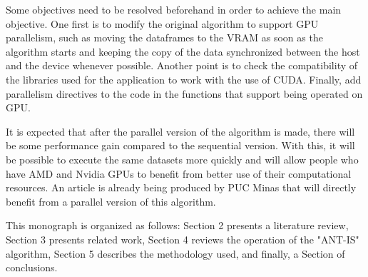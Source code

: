 Some objectives need to be resolved beforehand in order to achieve the main objective. One first is to modify the original algorithm to support GPU parallelism, such as moving the dataframes to the VRAM as soon as the algorithm starts and keeping the copy of the data synchronized between the host and the device whenever possible. Another point is to check the compatibility of the libraries used for the application to work with the use of CUDA. Finally, add parallelism directives to the code in the functions that support being operated on GPU.

It is expected that after the parallel version of the algorithm is made, there will be some performance gain compared to the sequential version. With this, it will be possible to execute the same datasets more quickly and will allow people who have AMD and Nvidia GPUs to benefit from better use of their computational resources. An article is already being produced by PUC Minas that will directly benefit from a parallel version of this algorithm.

This monograph is organized as follows: Section 2 presents a literature review, Section 3 presents related work, Section 4 reviews the operation of the "ANT-IS" algorithm, Section 5 describes the methodology used, and finally, a Section of conclusions.
